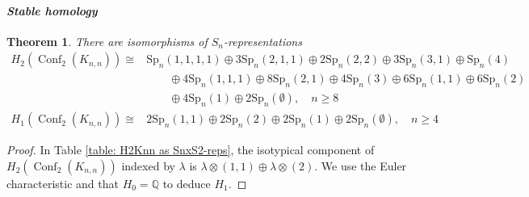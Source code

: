 \documentclass[12pt]{amsart}
\newtheorem{thm}{Theorem}[section]
\theoremstyle{definition}
\newcommand{\Q}{\mathbb{Q}}
\newcommand{\conf}{\operatorname{Conf}}
\begin{document}
\paragraph{\textit{Stable homology}}


\begin{thm}\label{thm: ordered bipartite}
There are isomorphisms of $S_n$-representations
\begin{align*}
H_2(\conf_2(K_{n,n})) \cong &\mathrm{Sp}_n(1,1,1,1)\oplus 3\mathrm{Sp}_n(2,1,1) \oplus 2\mathrm{Sp}_n(2,2) \oplus 3\mathrm{Sp}_n(3,1) \oplus \mathrm{Sp}_n(4) \\
&\qquad \oplus 4\mathrm{Sp}_n(1,1,1) \oplus 8\mathrm{Sp}_n(2,1) \oplus 4\mathrm{Sp}_n(3) \oplus 6\mathrm{Sp}_n(1,1) \oplus 6\mathrm{Sp}_n(2) \\
&\qquad \oplus 4\mathrm{Sp}_n(1) \oplus 2\mathrm{Sp}_n(\emptyset), \quad n\geq 8\\
H_1(\conf_2(K_{n,n}))\cong & 2\mathrm{Sp}_n(1,1)\oplus 2\mathrm{Sp}_n(2)\oplus 2\mathrm{Sp}_n(1)\oplus 2\mathrm{Sp}_n(\emptyset),\quad n\geq 4
\end{align*}
\end{thm}

\begin{proof}
In Table \ref{table: H2Knn as SnxS2-reps}, the isotypical component of $H_2(\conf_2(K_{n,n}))$ indexed by $\lambda$ is $\lambda \otimes (1,1) \oplus \lambda \otimes (2)$. We use the Euler characteristic and that $H_0=\Q$ to deduce $H_1$.
\end{proof}
\end{document}
